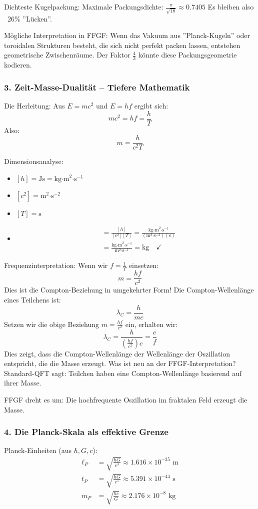 	Dichteste Kugelpackung:
	Maximale Packungsdichte: \( \frac{\pi}{\sqrt{18}} \approx 0.7405 \)
	Es bleiben also ~26\% ''Lücken''.
	
	Mögliche Interpretation in FFGF:
	Wenn das Vakuum aus ''Planck-Kugeln'' oder toroidalen Strukturen besteht, die sich nicht perfekt packen lassen, entstehen geometrische Zwischenräume. Der Faktor \( \frac{4}{3} \) könnte diese Packungsgeometrie kodieren.
	
	\subsubsection{3. Zeit-Masse-Dualität – Tiefere Mathematik}
	Die Herleitung:
	Aus \( E = mc^2 \) und \( E = hf \) ergibt sich:
	\[
	mc^2 = hf = \frac{h}{T}
	\]
	Also:
	\[
	m = \frac{h}{c^2 T}
	\]
	
	Dimensionsanalyse:
	\begin{itemize}
		\item \( [h] = \text{Js} = \text{kg·m}^2\text{·s}^{-1} \)
		\item \( [c^2] = \text{m}^2\text{·s}^{-2} \)
		\item \( [T] = \text{s} \)
		\item \begin{align}
			[m] &= \frac{[h]}{[c^2][T]} = \frac{\text{kg·m}^2\text{·s}^{-1}}{(\text{m}^2\text{·s}^{-2})(\text{s})} \\
			&= \frac{\text{kg·m}^2\text{·s}^{-1}}{\text{m}^2\text{·s}^{-1}} = \text{kg} \quad \checkmark
		\end{align}
	\end{itemize}
	
	Frequenzinterpretation:
	Wenn wir \( f = \frac{1}{T} \) einsetzen:
	\[
	m = \frac{hf}{c^2}
	\]
	Dies ist die Compton-Beziehung in umgekehrter Form! Die Compton-Wellenlänge eines Teilchens ist:
	\[
	\lambda_C = \frac{h}{mc}
	\]
	Setzen wir die obige Beziehung \( m = \frac{hf}{c^2} \) ein, erhalten wir:
	\[
	\lambda_C = \frac{h}{\left(\frac{hf}{c^2}\right)c} = \frac{c}{f}
	\]
	Dies zeigt, dass die Compton-Wellenlänge der Wellenlänge der Oszillation entspricht, die die Masse erzeugt.
	Was ist neu an der FFGF-Interpretation?
	Standard-QFT sagt: Teilchen haben eine Compton-Wellenlänge basierend auf ihrer Masse.
	
	FFGF dreht es um: Die hochfrequente Oszillation im fraktalen Feld erzeugt die Masse.
	
	\subsubsection{4. Die Planck-Skala als effektive Grenze}
	Planck-Einheiten (aus \( \hbar, G, c \)):
	\begin{align}
		\ell_P &= \sqrt{\frac{\hbar G}{c^3}} \approx 1.616 \times 10^{-35} \text{ m} \\
		t_P &= \sqrt{\frac{\hbar G}{c^5}} \approx 5.391 \times 10^{-44} \text{ s} \\
		m_P &= \sqrt{\frac{\hbar c}{G}} \approx 2.176 \times 10^{-8} \text{ kg}
	\end{align}
	
